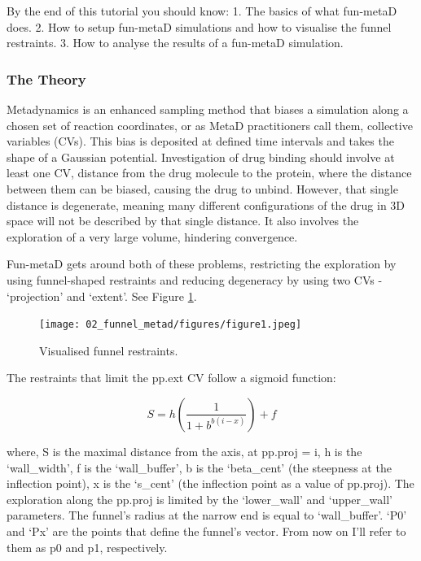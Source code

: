 By the end of this tutorial you should know: 1. The basics of what
fun-metaD does. 2. How to setup fun-metaD simulations and how to
visualise the funnel restraints. 3. How to analyse the results of a
fun-metaD simulation.

\hypertarget{the-theory}{%
\subsubsection{The Theory}\label{the-theory}}

Metadynamics is an enhanced sampling method that biases a simulation
along a chosen set of reaction coordinates, or as MetaD practitioners
call them, collective variables (CVs). This bias is deposited at defined
time intervals and takes the shape of a Gaussian potential.
Investigation of drug binding should involve at least one CV, distance
from the drug molecule to the protein, where the distance between them
can be biased, causing the drug to unbind. However, that single distance
is degenerate, meaning many different configurations of the drug in 3D
space will not be described by that single distance. It also involves
the exploration of a very large volume, hindering convergence.

Fun-metaD gets around both of these problems, restricting the
exploration by using funnel-shaped restraints and reducing degeneracy by
using two CVs - `projection' and `extent'. See Figure \ref{fig:funnel}.

\begin{figure}[htp]
\texttt{[image: 02\_funnel\_metad/figures/figure1.jpeg]}
\caption{Visualised funnel restraints.}
\label{fig:funnel}
\end{figure}

The restraints that limit the pp.ext CV follow a sigmoid function:

\begin{equation}
S = h\left(\frac{1}{1+b^{b(i-x)}}\right) + f
\end{equation}

where, S is the maximal distance from the axis, at pp.proj = i, h is the
`wall\_width', f is the `wall\_buffer', b is the `beta\_cent' (the
steepness at the inflection point), x is the `s\_cent' (the inflection
point as a value of pp.proj). The exploration along the pp.proj is
limited by the `lower\_wall' and `upper\_wall' parameters. The funnel's
radius at the narrow end is equal to `wall\_buffer'. `P0' and `Px' are
the points that define the funnel's vector. From now on I'll refer to
them as p0 and p1, respectively.

